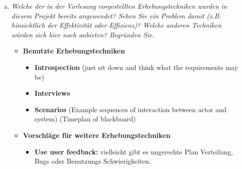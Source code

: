 \begin{enumerate} [a)]
\newpage    
    \item {\itshape Welche der in der Vorlesung vorgestellten Erhebungstechniken wurden in diesem Projekt bereits angewendet? Sehen Sie ein Problem damit (z.B. hinsichtlich der Effektivität oder Effizienz)? Welche anderen Techniken würden sich hier noch anbieten? Begründen Sie.}
    \begin{itemize}
        \item \textbf{Benutzte Erhebungstechniken}
        \begin{itemize}
            \item \textbf{Introspection} (just sit down and think what the requirements may be)
            \item \textbf{Interviews}
            \item \textbf{Scenarios} (Example sequences of interaction between actor and system) (Timeplan of blackboard)
        \end{itemize}
        
        \item \textbf{Vorschläge für weitere Erhebungstechniken}
        \begin{itemize}
            \item \textbf{Use user feedback:} vielleicht gibt es ungerechte Plan Verteilung, Bugs oder Benutzungs Schwierigkeiten.
        \end{itemize}
    \end{itemize}



\end{enumerate}
